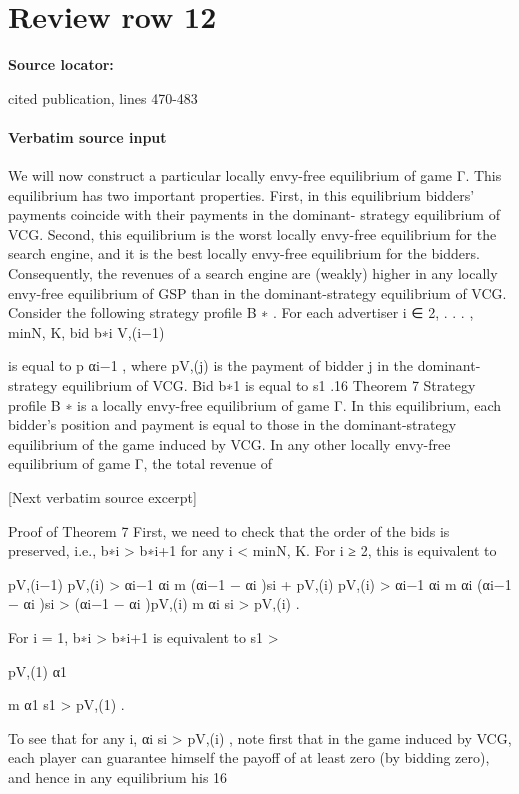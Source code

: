 \documentclass[10pt]{article}
\begin{document}
\section*{Review row 12}
\textbf{Source locator:} {\footnotesize\raggedright cited publication, lines 470-\allowbreak{}483\par}
\paragraph{Verbatim source input}
\begin{ReviewVerbatim}
We will now construct a particular locally envy-free equilibrium of game Γ. This equilibrium
has two important properties. First, in this equilibrium bidders’ payments coincide with their
payments in the dominant- strategy equilibrium of VCG. Second, this equilibrium is the worst
locally envy-free equilibrium for the search engine, and it is the best locally envy-free equilibrium
for the bidders. Consequently, the revenues of a search engine are (weakly) higher in any locally
envy-free equilibrium of GSP than in the dominant-strategy equilibrium of VCG.
Consider the following strategy profile B ∗ . For each advertiser i ∈ {2, . . . , min{N, K}}, bid b∗i
V,(i−1)

is equal to p αi−1 , where pV,(j) is the payment of bidder j in the dominant-strategy equilibrium of
VCG. Bid b∗1 is equal to s1 .16
Theorem 7 Strategy profile B ∗ is a locally envy-free equilibrium of game Γ. In this equilibrium,
each bidder’s position and payment is equal to those in the dominant-strategy equilibrium of the
game induced by VCG. In any other locally envy-free equilibrium of game Γ, the total revenue of

[Next verbatim source excerpt]

Proof of Theorem 7
First, we need to check that the order of the bids is preserved, i.e., b∗i > b∗i+1 for any i < min{N, K}.
For i ≥ 2, this is equivalent to

pV,(i−1)
pV,(i)
>
αi−1
αi
m
(αi−1 − αi )si + pV,(i)
pV,(i)
>
αi−1
αi
m
αi (αi−1 − αi )si > (αi−1 − αi )pV,(i)
m
αi si > pV,(i) .

For i = 1, b∗i > b∗i+1 is equivalent to
s1 >

pV,(1)
α1

m
α1 s1 > pV,(1) .

To see that for any i, αi si > pV,(i) , note first that in the game induced by VCG, each player can
guarantee himself the payoff of at least zero (by bidding zero), and hence in any equilibrium his
16



\end{ReviewVerbatim}
\end{document}

